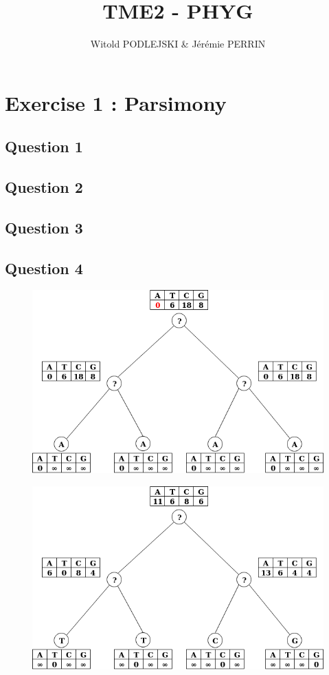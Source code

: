 \documentclass[]{article}
\title{TME2 - PHYG}
\author{Witold PODLEJSKI \& Jérémie PERRIN}
\begin{document}
\maketitle

\section{Exercise 1 : Parsimony}
\subsection{Question 1}
\subsection{Question 2}
\subsection{Question 3}
\subsection{Question 4}

\begin{figure}[h]
	\includegraphics*[width = \linewidth]{image/tree_1.png}
\end{figure}

\begin{figure}[h]
	\includegraphics*[width = \linewidth]{image/tree_2.png}
\end{figure}
\end{document}
